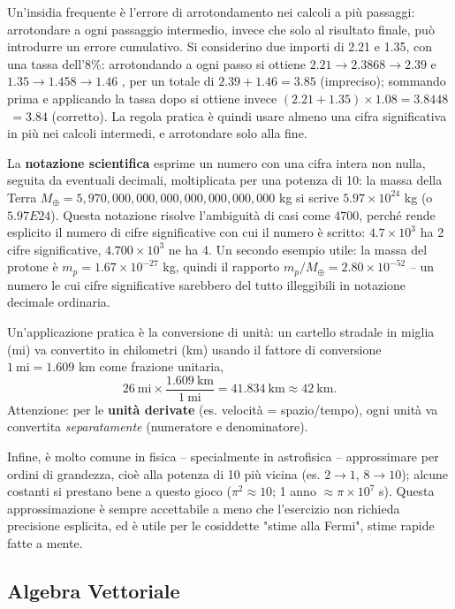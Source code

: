 \documentclass[a4paper,11pt]{article}
\begin{document}
Un'insidia frequente è l'errore di arrotondamento nei calcoli a più passaggi: arrotondare a ogni passaggio intermedio, invece che solo al risultato finale, può introdurre un errore cumulativo. Si considerino due importi di 2.21\texteuro{} e 1.35\texteuro{}, con una tassa dell'8\%: arrotondando a ogni passo si ottiene $2.21 \to 2.3868 \to 2.39$ \texteuro{} e $1.35 \to 1.458 \to 1.46$ \texteuro{}, per un totale di $2.39+1.46=\mathbf{3.85}$ \texteuro{} (impreciso); sommando prima e applicando la tassa dopo si ottiene invece $(2.21+1.35)\times1.08=3.8448$ \texteuro{}$\,=\mathbf{3.84}$ \texteuro{} (corretto). La regola pratica è quindi usare almeno una cifra significativa in più nei calcoli intermedi, e arrotondare solo alla fine.

La \textbf{notazione scientifica} esprime un numero con una cifra intera non nulla, seguita da eventuali decimali, moltiplicata per una potenza di 10: la massa della Terra $M_\oplus=5{,}970{,}000{,}000{,}000{,}000{,}000{,}000{,}000$ kg si scrive $5.97\times10^{24}$ kg (o $5.97E24$). Questa notazione risolve l'ambiguità di casi come $4700$, perché rende esplicito il numero di cifre significative con cui il numero è scritto: $4.7\times10^3$ ha 2 cifre significative, $4.700\times10^3$ ne ha 4. Un secondo esempio utile: la massa del protone è $m_p=1.67\times10^{-27}$ kg, quindi il rapporto $m_p/M_\oplus=2.80\times10^{-52}$ -- un numero le cui cifre significative sarebbero del tutto illeggibili in notazione decimale ordinaria.

Un'applicazione pratica è la conversione di unità: un cartello stradale in miglia (mi) va convertito in chilometri (km) usando il fattore di conversione $1\ \text{mi}=1.609$ km come frazione unitaria,
\[
26\ \text{mi} \times \frac{1.609\ \text{km}}{1\ \text{mi}} = 41.834\ \text{km} \approx 42\ \text{km}.
\]
Attenzione: per le \textbf{unità derivate} (es. velocità = spazio/tempo), ogni unità va convertita \emph{separatamente} (numeratore e denominatore).

Infine, è molto comune in fisica -- specialmente in astrofisica -- approssimare per ordini di grandezza, cioè alla potenza di 10 più vicina (es. $2\to1$, $8\to10$); alcune costanti si prestano bene a questo gioco ($\pi^2\approx10$; 1 anno $\approx\pi\times10^7$ s). Questa approssimazione è sempre accettabile a meno che l'esercizio non richieda precisione esplicita, ed è utile per le cosiddette "stime alla Fermi", stime rapide fatte a mente.

\subsection{Algebra Vettoriale}
\end{document}
